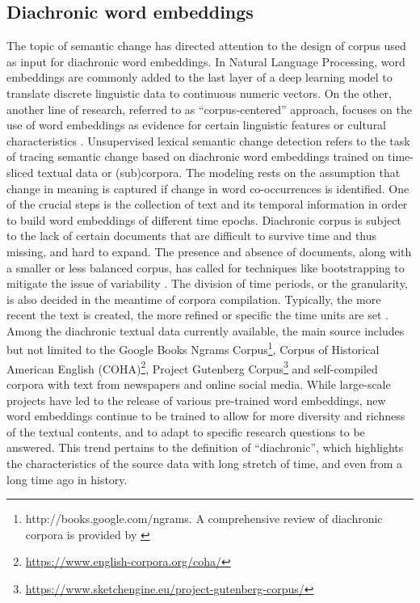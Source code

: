 \subsection{Diachronic word embeddings}
The topic of semantic change has directed attention to the design of corpus used as input for diachronic word embeddings. In Natural Language Processing, word embeddings are commonly added to the last layer of a deep learning model to translate discrete linguistic data to continuous numeric vectors. On the other, another line of research, referred to as ``corpus-centered'' approach, focuses on the use of word embeddings as evidence for certain linguistic features or cultural characteristics \parencite{antoniak2018evaluating}. Unsupervised lexical semantic change detection refers to the task of tracing semantic change based on diachronic word embeddings trained on time-sliced textual data or (sub)corpora. The modeling rests on the assumption that change in meaning is captured if change in word co-occurrences is identified. One of the crucial steps is the collection of text and its temporal information in order to build word embeddings of different time epochs. Diachronic corpus is subject to the lack of certain documents that are difficult to survive time and thus missing, and hard to expand. The presence and absence of documents, along with a smaller or less balanced corpus, has called for techniques like bootstrapping to mitigate the issue of variability \parencite{antoniak2018evaluating}.  The division of time periods, or the granularity, is also decided in the meantime of corpora compilation. Typically, the more recent the text is created, the more refined or specific the time units are set \parencite{kutuzov2018survey}. Among the diachronic textual data currently available, the main source includes but not limited to the Google Books Ngrams Corpus\footnote{http://books.google.com/ngrams. A comprehensive review of diachronic corpora is provided by \textcite[38--41]{tahmasebi2018survey}}, Corpus of Historical American English (COHA)\footnote{\url{https://www.english-corpora.org/coha/}}, Project Gutenberg Corpus\footnote{\url{https://www.sketchengine.eu/project-gutenberg-corpus/}} and self-compiled corpora with text from newspapers and online social media. While large-scale projects have led to the release of various pre-trained word embeddings, new word embeddings continue to be trained to allow for more diversity and richness of the textual contents, and to adapt to specific research questions to be answered. This trend pertains to the definition of ``diachronic'', which highlights the characteristics of the source data with long stretch of time, and even from a long time ago in history.


